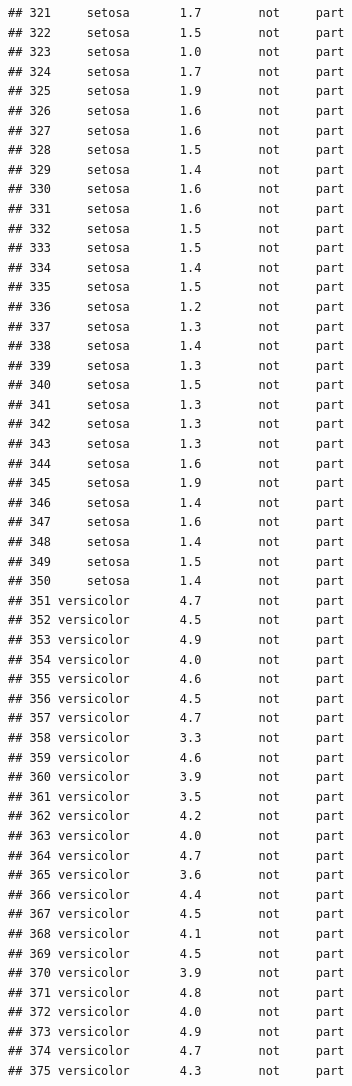 \documentclass[krantz2]{krantz}\usepackage{knitr}%
\begin{document}
\begin{knitrout}
\begin{kframe}
\begin{verbatim}
## 321     setosa       1.7        not     part
## 322     setosa       1.5        not     part
## 323     setosa       1.0        not     part
## 324     setosa       1.7        not     part
## 325     setosa       1.9        not     part
## 326     setosa       1.6        not     part
## 327     setosa       1.6        not     part
## 328     setosa       1.5        not     part
## 329     setosa       1.4        not     part
## 330     setosa       1.6        not     part
## 331     setosa       1.6        not     part
## 332     setosa       1.5        not     part
## 333     setosa       1.5        not     part
## 334     setosa       1.4        not     part
## 335     setosa       1.5        not     part
## 336     setosa       1.2        not     part
## 337     setosa       1.3        not     part
## 338     setosa       1.4        not     part
## 339     setosa       1.3        not     part
## 340     setosa       1.5        not     part
## 341     setosa       1.3        not     part
## 342     setosa       1.3        not     part
## 343     setosa       1.3        not     part
## 344     setosa       1.6        not     part
## 345     setosa       1.9        not     part
## 346     setosa       1.4        not     part
## 347     setosa       1.6        not     part
## 348     setosa       1.4        not     part
## 349     setosa       1.5        not     part
## 350     setosa       1.4        not     part
## 351 versicolor       4.7        not     part
## 352 versicolor       4.5        not     part
## 353 versicolor       4.9        not     part
## 354 versicolor       4.0        not     part
## 355 versicolor       4.6        not     part
## 356 versicolor       4.5        not     part
## 357 versicolor       4.7        not     part
## 358 versicolor       3.3        not     part
## 359 versicolor       4.6        not     part
## 360 versicolor       3.9        not     part
## 361 versicolor       3.5        not     part
## 362 versicolor       4.2        not     part
## 363 versicolor       4.0        not     part
## 364 versicolor       4.7        not     part
## 365 versicolor       3.6        not     part
## 366 versicolor       4.4        not     part
## 367 versicolor       4.5        not     part
## 368 versicolor       4.1        not     part
## 369 versicolor       4.5        not     part
## 370 versicolor       3.9        not     part
## 371 versicolor       4.8        not     part
## 372 versicolor       4.0        not     part
## 373 versicolor       4.9        not     part
## 374 versicolor       4.7        not     part
## 375 versicolor       4.3        not     part

\end{verbatim}
\end{kframe}
\end{knitrout}
\end{document}

